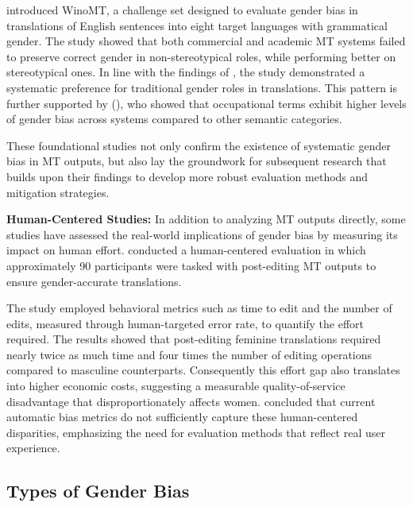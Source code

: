 \citet{stanovskyEvaluatingGenderBias2019} introduced WinoMT, a challenge set designed to evaluate gender bias in translations of English sentences into eight target languages with grammatical gender. The study showed that both commercial and academic MT systems failed to preserve correct gender in non-stereotypical roles, while performing better on stereotypical ones. In line with the findings of \citeauthor{pratesAssessingGenderBias2019}, the study demonstrated a systematic preference for traditional gender roles in translations. This pattern is further supported by \citeauthor{choMeasuringGenderBias2019} (\citeyear{choMeasuringGenderBias2019}), who showed that occupational terms exhibit higher levels of gender bias across systems compared to other semantic categories. 

These foundational studies not only confirm the existence of systematic gender bias in MT outputs, but also lay the groundwork for subsequent research that builds upon their findings to develop more robust evaluation methods and mitigation strategies.

\textbf{Human-Centered Studies:} In addition to analyzing MT outputs directly, some studies have assessed the real-world implications of gender bias by measuring its impact on human effort. \citet{savoldiWhatHarmQuantifying2024} conducted a human-centered evaluation in which approximately 90 participants were tasked with post-editing MT outputs to ensure gender-accurate translations.

The study employed behavioral metrics such as time to edit and the number of edits, measured through human-targeted error rate, to quantify the effort required. The results showed that post-editing feminine translations required nearly twice as much time and four times the number of editing operations compared to masculine counterparts. Consequently this effort gap also translates into higher economic costs, suggesting a measurable quality-of-service disadvantage that disproportionately affects women. \citeauthor{savoldiWhatHarmQuantifying2024} concluded that current automatic bias metrics do not sufficiently capture these human-centered disparities, emphasizing the need for evaluation methods that reflect real user experience.

\subsection{Types of Gender Bias}

